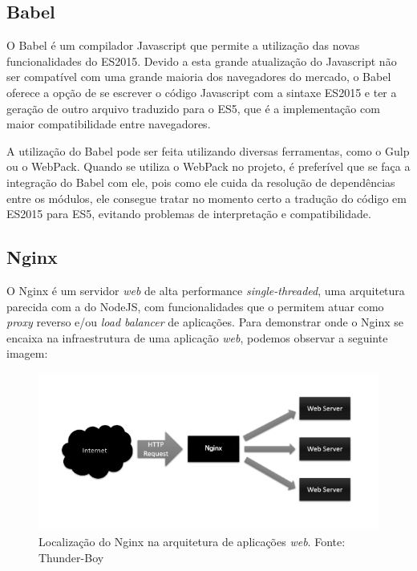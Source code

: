 \subsection{Babel}
O Babel \cite{babel} é um compilador Javascript que permite a utilização das novas funcionalidades do ES2015. Devido a esta grande atualização do Javascript não ser compatível com uma grande maioria dos navegadores do mercado, o Babel oferece a opção de se escrever o código Javascript com a sintaxe ES2015 e ter a geração de outro arquivo traduzido para o ES5, que é a implementação com maior compatibilidade entre navegadores.

A utilização do Babel pode ser feita utilizando diversas ferramentas, como o Gulp ou o WebPack. Quando se utiliza o WebPack no projeto, é preferível que se faça a integração do Babel com ele, pois como ele cuida da resolução de dependências entre os módulos, ele consegue tratar no momento certo a tradução do código em ES2015 para ES5, evitando problemas de interpretação e compatibilidade. 

\subsection{Nginx}
O Nginx \cite{nginx} é um servidor \textit{web} de alta performance \textit{single-threaded}, uma arquitetura parecida com a do NodeJS, com funcionalidades que o permitem atuar como \textit{proxy} reverso e/ou \textit{load balancer} de aplicações. Para demonstrar onde o Nginx se encaixa na infraestrutura de uma aplicação \textit{web}, podemos observar a seguinte imagem:

\begin{figure}[!htb]
	\centering
	\includegraphics[scale=1]{imagens/nginx.png}
	\caption{\small Localização do Nginx na arquitetura de aplicações \textit{web}. Fonte: Thunder-Boy \cite{img-nginx}}
	\label{fig:nginx}
\end{figure}

